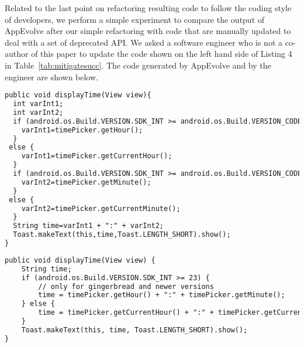 Related to the last point on refactoring resulting code to follow the coding style of developers, we perform a simple experiment to compare the output of AppEvolve after our simple refactoring with code that are manually updated to deal with a set of deprecated API.  We
asked a software engineer who is not a co-author of this paper to update the code shown on the left hand side of Listing 4  in Table~\ref{tab:mitigatesucc}. The code generated by AppEvolve and by the engineer are shown below.


\vspace{0.2cm}
\vspace{0.5cm}\begin{lstlisting}[language=diff,numbers=none]
public void displayTime(View view){
  int varInt1;
  int varInt2;
  if (android.os.Build.VERSION.SDK_INT >= android.os.Build.VERSION_CODES.M) {
    varInt1=timePicker.getHour();
  }
 else {
    varInt1=timePicker.getCurrentHour();
  }
  if (android.os.Build.VERSION.SDK_INT >= android.os.Build.VERSION_CODES.M) {
    varInt2=timePicker.getMinute();
  }
 else {
    varInt2=timePicker.getCurrentMinute();
  }
  String time=varInt1 + ":" + varInt2;
  Toast.makeText(this,time,Toast.LENGTH_SHORT).show();
}
\end{lstlisting}


\vspace{0.7cm}
\vspace{0.5cm}\begin{lstlisting}[language=diff,numbers=none]
public void displayTime(View view) {
    String time;
    if (android.os.Build.VERSION.SDK_INT >= 23) {
        // only for gingerbread and newer versions
        time = timePicker.getHour() + ":" + timePicker.getMinute();
    } else {
        time = timePicker.getCurrentHour() + ":" + timePicker.getCurrentMinute();
    }
    Toast.makeText(this, time, Toast.LENGTH_SHORT).show();
}
\end{lstlisting}


